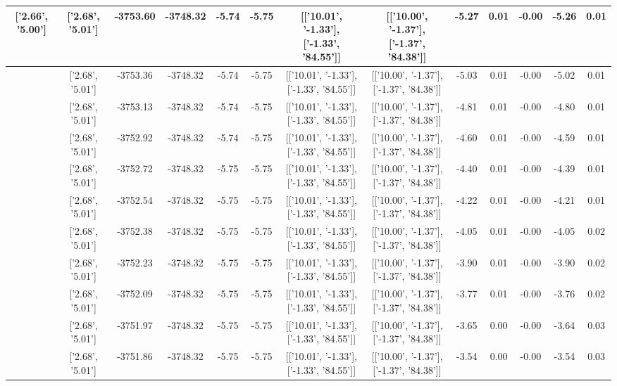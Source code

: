 \begin{table}[htbp]
\begin{adjustbox}{angle=90}
\begin{tabular}{|c|c|c|c|c|c|c|c|c|c|c|c|c|}
 ['2.66', '5.00'] & ['2.68', '5.01'] & -3753.60 & -3748.32 & -5.74 & -5.75 & [['10.01', '-1.33'], ['-1.33', '84.55']] & [['10.00', '-1.37'], ['-1.37', '84.38']] & -5.27 & 0.01 & -0.00 & -5.26 & 0.01\\ \hline
 ['2.66', '5.00'] & ['2.68', '5.01'] & -3753.36 & -3748.32 & -5.74 & -5.75 & [['10.01', '-1.33'], ['-1.33', '84.55']] & [['10.00', '-1.37'], ['-1.37', '84.38']] & -5.03 & 0.01 & -0.00 & -5.02 & 0.01\\ \hline
 ['2.67', '5.00'] & ['2.68', '5.01'] & -3753.13 & -3748.32 & -5.74 & -5.75 & [['10.01', '-1.33'], ['-1.33', '84.55']] & [['10.00', '-1.37'], ['-1.37', '84.38']] & -4.81 & 0.01 & -0.00 & -4.80 & 0.01\\ \hline
 ['2.67', '5.00'] & ['2.68', '5.01'] & -3752.92 & -3748.32 & -5.74 & -5.75 & [['10.01', '-1.33'], ['-1.33', '84.55']] & [['10.00', '-1.37'], ['-1.37', '84.38']] & -4.60 & 0.01 & -0.00 & -4.59 & 0.01\\ \hline
 ['2.67', '5.00'] & ['2.68', '5.01'] & -3752.72 & -3748.32 & -5.75 & -5.75 & [['10.01', '-1.33'], ['-1.33', '84.55']] & [['10.00', '-1.37'], ['-1.37', '84.38']] & -4.40 & 0.01 & -0.00 & -4.39 & 0.01\\ \hline
 ['2.67', '5.00'] & ['2.68', '5.01'] & -3752.54 & -3748.32 & -5.75 & -5.75 & [['10.01', '-1.33'], ['-1.33', '84.55']] & [['10.00', '-1.37'], ['-1.37', '84.38']] & -4.22 & 0.01 & -0.00 & -4.21 & 0.01\\ \hline
 ['2.67', '5.00'] & ['2.68', '5.01'] & -3752.38 & -3748.32 & -5.75 & -5.75 & [['10.01', '-1.33'], ['-1.33', '84.55']] & [['10.00', '-1.37'], ['-1.37', '84.38']] & -4.05 & 0.01 & -0.00 & -4.05 & 0.02\\ \hline
 ['2.67', '5.00'] & ['2.68', '5.01'] & -3752.23 & -3748.32 & -5.75 & -5.75 & [['10.01', '-1.33'], ['-1.33', '84.55']] & [['10.00', '-1.37'], ['-1.37', '84.38']] & -3.90 & 0.01 & -0.00 & -3.90 & 0.02\\ \hline
 ['2.67', '5.00'] & ['2.68', '5.01'] & -3752.09 & -3748.32 & -5.75 & -5.75 & [['10.01', '-1.33'], ['-1.33', '84.55']] & [['10.00', '-1.37'], ['-1.37', '84.38']] & -3.77 & 0.01 & -0.00 & -3.76 & 0.02\\ \hline
 ['2.67', '5.00'] & ['2.68', '5.01'] & -3751.97 & -3748.32 & -5.75 & -5.75 & [['10.01', '-1.33'], ['-1.33', '84.55']] & [['10.00', '-1.37'], ['-1.37', '84.38']] & -3.65 & 0.00 & -0.00 & -3.64 & 0.03\\ \hline
 ['2.68', '5.00'] & ['2.68', '5.01'] & -3751.86 & -3748.32 & -5.75 & -5.75 & [['10.01', '-1.33'], ['-1.33', '84.55']] & [['10.00', '-1.37'], ['-1.37', '84.38']] & -3.54 & 0.00 & -0.00 & -3.54 & 0.03\\ \hline

\end{tabular}
\end{adjustbox}
\end{table}
